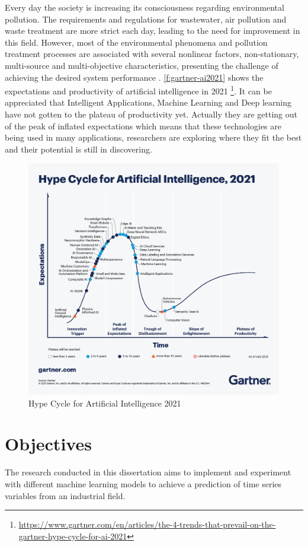 Every day the society is increasing its consciousness regarding environmental pollution. The  requirements and regulations for wastewater, air pollution and waste treatment are more strict each day, leading to the need for improvement in this field. However, most of the environmental phenomena and pollution treatment processes are associated with several nonlinear factors, non-stationary, multi-source and multi-objective characteristics, presenting the challenge of achieving the desired system performance \cite{Ye2020}. \autoref{f:gartner-ai2021} shows the expectations and productivity of artificial intelligence in 2021 \footnote{\url{https://www.gartner.com/en/articles/the-4-trends-that-prevail-on-the-gartner-hype-cycle-for-ai-2021}}. It can be appreciated that Intelligent Applications, Machine Learning and Deep learning have not gotten to the plateau of productivity yet. Actually they are getting out of the peak of inflated expectations which means that these technologies are being used in many applications, researchers are exploring where they fit the best and their potential is still in discovering. 

\begin{figure}[t]
\centering
\includegraphics[width=\linewidth]{figures/Ch1/gartner-ai2021.png}
\caption{Hype Cycle for Artificial Intelligence 2021}
\label{f:gartner-ai2021}
\end{figure}

\section{Objectives}
\label{s:Objectives}
The research conducted in this dissertation aims to implement and experiment with different machine learning models to achieve a prediction of time series variables from an industrial field.


